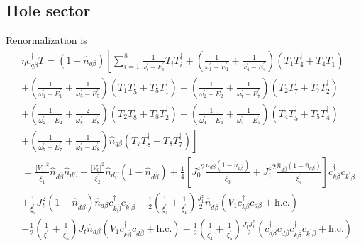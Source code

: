 \documentclass[twoside,11pt]{report}
\numberwithin{equation}{section}
\begin{document}
\subsection{Hole sector}
Renormalization is
\begin{equation}\begin{aligned}
&\eta c^\dagger_{q\beta}T = \left( 1 - \hat n_{q\beta} \right) \left[\sum_{i=1}^8\frac{1}{\omega^\prime_i - E^\prime_i} T_i T_i^\dagger +\left(\frac{1}{\omega^\prime_1 - E^\prime_1} + \frac{1}{\omega^\prime_4 - E^\prime_4}\right) \left(T_1 T_4^\dagger + T_4 T_1^\dagger \right)\right. \\
&\left. +\left(\frac{1}{\omega^\prime_1 - E^\prime_1} + \frac{1}{\omega^\prime_5 - E^\prime_5}\right) \left(T_1 T_5^\dagger + T_5 T_1^\dagger \right) + \left(\frac{1}{\omega^\prime_2 - E^\prime_2} + \frac{1}{\omega^\prime_7 - E^\prime_7}\right) \left(T_2 T_7^\dagger + T_7 T_2^\dagger \right) \right.\\
&\left. + \left(\frac{1}{\omega^\prime_2 - E^\prime_2} + \frac{2}{\omega^\prime_8 - E^\prime_8}\right) \left(T_2 T_8^\dagger + T_8 T_2^\dagger \right) + \left(\frac{1}{\omega^\prime_4 - E^\prime_4} + \frac{1}{\omega^\prime_5 - E^\prime_5}\right) \left(T_4 T_5^\dagger + T_5 T_4^\dagger \right) \right.\\
&\left. + \left(\frac{1}{\omega^\prime_7 - E^\prime_7} + \frac{1}{\omega^\prime_8 - E^\prime_8}\right)\hat n_{q\beta} \left(T_7 T_8^\dagger + T_8 T_7^\dagger \right)\right]\\
	&=\frac{|V_1|^2}{\xi^\prime_1}\hat n_{d\overline\beta}\hat n_{d\beta} + \frac{|V_0|^2}{\xi^\prime_2}\hat n_{d\beta}\left(1 - \hat n_{d\overline\beta}\right)+\frac{1}{4}\left[ {J_0^z}^2\frac{\hat n_{d\beta}\left( 1 - \hat n_{d\overline\beta} \right) }{\xi^\prime_3} + {J_1^z}^2\frac{\hat n_{d\overline\beta}\left( 1 - \hat n_{d\beta} \right)}{\xi^\prime_4} \right]c^\dagger_{k\beta}c_{k^\prime\beta} \\
	&+ \frac{1}{\xi^\prime_5}J_t^2 \left( 1 - \hat n_{d\overline\beta} \right) \hat n_{d\beta} c^\dagger_{k\overline\beta} c_{k^\prime\overline\beta} - \frac{1}{2} \left(\frac{1}{\xi^\prime_4} + \frac{1}{\xi^\prime_1}\right)\frac{J_1^z}{2}\hat n_{d\overline\beta} \left(V_1 c^\dagger_{k\beta}c_{d\beta} + \text{h.c.}\right) \\
	&- \frac{1}{2}\left(\frac{1}{\xi^\prime_1} + \frac{1}{\xi^\prime_5}\right)J_t \hat n_{d\beta}\left(V_1 c^\dagger_{k\overline\beta}c_{d\overline\beta} + \text{h.c.}\right) - \frac{1}{2}\left(\frac{1}{\xi^\prime_4} + \frac{1}{\xi^\prime_5}\right)\frac{J_t J^z_1}{2}\left(c^\dagger_{d\beta}c_{d\overline\beta}c^\dagger_{k\overline\beta}c_{k^\prime\beta} + \text{h.c.}\right)\\

\end{aligned}
\end{equation}
\end{document}
